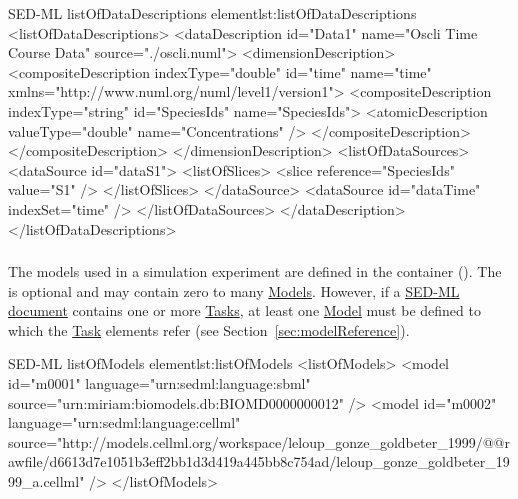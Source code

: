 
\begin{myXmlLst}{SED-ML listOfDataDescriptions element}{lst:listOfDataDescriptions}
<listOfDataDescriptions>
	<dataDescription id="Data1" name="Oscli Time Course Data" source="./oscli.numl">
		<dimensionDescription>
			<compositeDescription indexType="double" id="time" name="time" xmlns="http://www.numl.org/numl/level1/version1">
        			<compositeDescription indexType="string" id="SpeciesIds" name="SpeciesIds">
         			<atomicDescription valueType="double" name="Concentrations" />
          		</compositeDescription>
      		</compositeDescription>
		</dimensionDescription>
		<listOfDataSources>
			<dataSource id="dataS1">
				<listOfSlices>
					<slice reference="SpeciesIds" value="S1" />
				</listOfSlices>
			</dataSource>
			<dataSource id="dataTime" indexSet="time" />
		</listOfDataSources>
	</dataDescription>
</listOfDataDescriptions>
\end{myXmlLst}


\subsubsection{}
\label{sec:listOfModels}
The models used in a simulation experiment are defined in the  container (). The  is optional and may contain zero to many \hyperref[class:model]{Models}. However, if a \hyperref[class:sed-ml]{SED-ML document} contains one or more \hyperref[class:abstractTask]{Tasks}, at least one \hyperref[class:model]{Model} must be defined to which the \hyperref[class:abstractTask]{Task} elements refer (see Section~\ref{sec:modelReference}).


\begin{myXmlLst}{SED-ML listOfModels element}{lst:listOfModels}
<listOfModels>
	<model id="m0001" language="urn:sedml:language:sbml" 
		source="urn:miriam:biomodels.db:BIOMD0000000012" />
	<model id="m0002" language="urn:sedml:language:cellml" 
		source="http://models.cellml.org/workspace/leloup_gonze_goldbeter_1999/@@rawfile/d6613d7e1051b3eff2bb1d3d419a445bb8c754ad/leloup_gonze_goldbeter_1999_a.cellml" />
</listOfModels>
\end{myXmlLst}


